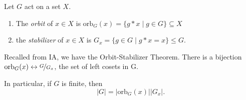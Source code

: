 \begin{definition}
    Let \(G\) act on a set \(X\).
    \begin{enumerate}
        \item The \textit{orbit} of \(x\in X\) is \(\mathrm{orb}_G(x) = \{g*x \mid g \in G\}\subseteq X\) 
        \item the \textit{stabilizer} of \(x \in X\) is \(G_x = \{g \in G \mid g * x = x\} \leq G\).
    \end{enumerate}
\end{definition}
Recalled from IA, we have the Orbit-Stabilizer Theorem.
There is a bijection \(\mathrm{orb}_G(x) \leftrightarrow \nicefrac{G}{G_x}\), the set of left cosets in G.

In particular, if \(G\) is finite, then
\[
    \left\vert G \right\vert = \left\vert \mathrm{orb}_G(x) \right\vert \left\vert G_x \right\vert.
\]

